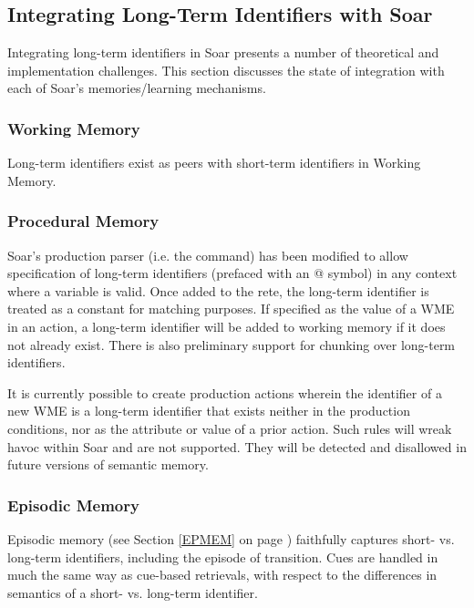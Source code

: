 \begin{figure}
\label{fig:smem-concept}
\end{figure}

\subsection{Integrating Long-Term Identifiers with Soar}
Integrating long-term identifiers in Soar presents a number of theoretical and implementation challenges.  This section discusses the state of integration with each of Soar's memories/learning mechanisms.

\subsubsection{Working Memory}
Long-term identifiers exist as peers with short-term identifiers in Working Memory.

\subsubsection{Procedural Memory}
Soar's production parser (i.e. the  command) has been modified to allow specification of long-term identifiers (prefaced with an {@} symbol) in any context where a variable is valid.  Once added to the rete, the long-term identifier is treated as a constant for matching purposes.  If specified as the value of a WME in an action, a long-term identifier will be added to working memory if it does not already exist.  There is also preliminary support for chunking over long-term identifiers.

It is currently possible to create production actions wherein the identifier of a new WME is a long-term identifier that exists neither in the production conditions, nor as the attribute or value of a prior action.  Such rules will wreak havoc within Soar and are not supported.  They will be detected and disallowed in future versions of semantic memory.

\subsubsection{Episodic Memory}
Episodic memory (see Section \ref{EPMEM} on page \pageref{EPMEM}) faithfully captures short- vs. long-term identifiers, including the episode of transition.  Cues are handled in much the same way as cue-based retrievals, with respect to the differences in semantics of a short- vs. long-term identifier.


